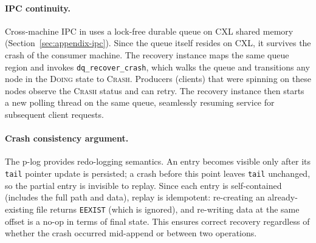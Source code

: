 \paragraph{IPC continuity.}
Cross-machine IPC in \sys uses a lock-free durable queue on CXL shared memory
(Section~\ref{sec:appendix-ipc}).  Since the queue itself resides on CXL,
it survives the crash of the consumer machine.  The recovery instance maps the
same queue region and invokes \texttt{dq\_recover\_crash}, which walks the
queue and transitions any node in the \textsc{Doing} state to \textsc{Crash}.
Producers (clients) that were spinning on these nodes observe the
\textsc{Crash} status and can retry.  The recovery instance then starts a new
polling thread on the same queue, seamlessly resuming service for subsequent
client requests.

\paragraph{Crash consistency argument.}
The p-log provides redo-logging semantics.  An entry becomes visible only after
its \texttt{tail} pointer update is persisted; a crash before this point leaves
\texttt{tail} unchanged, so the partial entry is invisible to replay.  Since
each entry is self-contained (includes the full path and data), replay is
idempotent: re-creating an already-existing file returns \texttt{EEXIST} (which
is ignored), and re-writing data at the same offset is a no-op in terms of
final state.  This ensures correct recovery regardless of whether the crash
occurred mid-append or between two operations.
